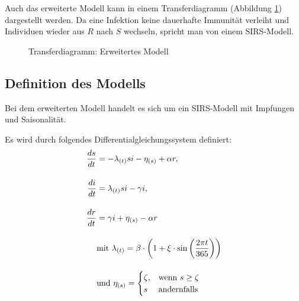 \documentclass[../main.tex]{subfiles}
\begin{document}
    Auch das erweiterte Modell kann in einem Transferdiagramm (Abbildung \ref{fig:extended_sir_transfer}) dargestellt werden. Da eine Infektion keine dauerhafte Immunität verleiht und Individuen wieder aus $R$ nach $S$ wechseln, spricht man von einem SIRS-Modell.

    \begin{figure}[h]
        \centering
        \caption{Transferdiagramm: Erweitertes Modell}
        \label{fig:extended_sir_transfer}
    \end{figure}

    
    \subsection{Definition des Modells}
    \label{ssec:definition2}

    Bei dem erweiterten Modell handelt es sich um ein SIRS-Modell mit Impfungen und Saisonalität. 
    
    Es wird durch folgendes Differentialgleichungssystem definiert:
    \begin{equation}
        \label{eq:sir_extended}
        \setlength{\jot}{0.5cm}
        \begin{aligned}
            \frac{ds}{dt} &= - \lambda_{(t)} s i - \eta_{(s)} + \alpha r, \\
            \frac{di}{dt} &= \lambda_{(t)} s i - \gamma i, \\
            \frac{dr}{dt} &= \gamma i + \eta_{(s)} - \alpha r \\
            &\text{mit } \lambda_{(t)} = \beta \cdot \left(1 + \xi \cdot \sin \left(\frac{2\pi t}{365}\right) \right) \\
            &\text{und } \eta_{(s)} = 
                \begin{cases}
                    \zeta, &\text{wenn } s \geq \zeta \\
                    s      &\text{andernfalls}
                \end{cases}
        \end{aligned}
    \end{equation}
\end{document}
